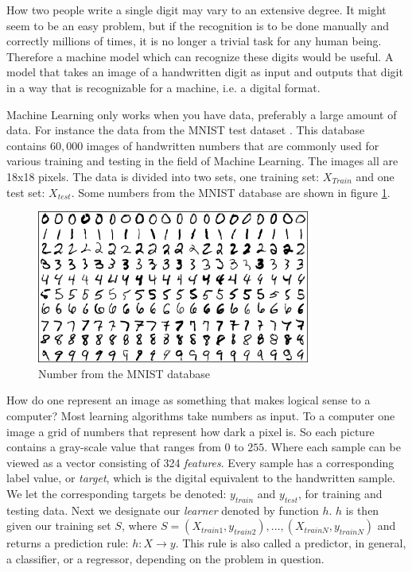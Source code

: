 	How two people write a single digit may vary to an extensive degree. It might seem to be an easy problem, but if the recognition is to be done manually and correctly millions of times, it is no longer a trivial task for any human being. Therefore a machine model which can recognize these digits would be useful. A model that takes an image of a handwritten digit as input and outputs that digit in a way that is recognizable for a machine, i.e. a digital format.
	
	Machine Learning only works when you have data, preferably a large amount of data. For instance the data from the MNIST test dataset \cite{lecun1998gradient}. This database contains $60,000$ images of handwritten numbers that are commonly used for various training and testing in the field of Machine Learning. The images all are 18x18 pixels. The data is divided into two sets, one training set: $X_{Train}$ and one test set: $X_{test}$. Some numbers from the MNIST database are shown in figure \ref{fig:MNIST}. 
	
\begin{figure}[ht]
    \centering
    \includegraphics[width=0.8\textwidth]{theory/figures/MNIST.png}
    \caption{Number from the MNIST database \cite{MNIST}}
    \label{fig:MNIST}
\end{figure}
	
	How do one represent an image as something that makes logical sense to a computer? Most learning algorithms take numbers as input. To a computer one image a grid of numbers that represent how dark a pixel is. So each picture contains a gray-scale value that ranges from $0$ to $255$. Where each sample can be viewed as a vector consisting of 324 \textit{features}. Every sample has a corresponding label value, or \textit{target}, which is the digital equivalent to the handwritten sample. We let the corresponding targets be denoted: $y_{train}$ and $y_{test}$, for training and testing data. Next we designate our \textit{learner} denoted by function $h$. $h$ is then given our training set $S$, where $S = (X_{train1}, y_{train2}),..., (X_{trainN}, y_{trainN})$ and returns a prediction rule: $h: X \rightarrow y$. This rule is also called a predictor, in general, a classifier, or a regressor, depending on the problem in question. 
	
